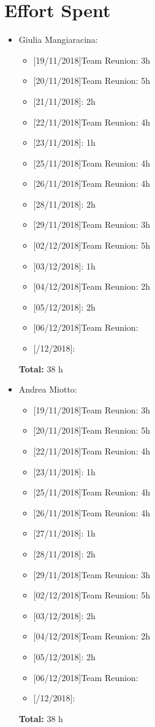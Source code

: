 \chapter{Effort Spent}

\begin{itemize}
\item Giulia Mangiaracina: 
\begin{itemize}
    \item {[}19/11/2018{]}Team Reunion: 3h
    \item {[}20/11/2018{]}Team Reunion: 5h
    \item {[}21/11/2018{]}: 2h
    \item {[}22/11/2018{]}Team Reunion: 4h
    \item {[}23/11/2018{]}: 1h
    \item {[}25/11/2018{]}Team Reunion: 4h
    \item {[}26/11/2018{]}Team Reunion: 4h
    \item {[}28/11/2018{]}: 2h
    \item {[}29/11/2018{]}Team Reunion: 3h
    \item {[}02/12/2018{]}Team Reunion: 5h
    \item {[}03/12/2018{]}: 1h
    \item {[}04/12/2018{]}Team Reunion:  2h
    \item {[}05/12/2018{]}: 2h
    \item {[}06/12/2018{]}Team Reunion:
    \item {[}/12/2018{]}: 
\end{itemize}
\textbf{Total:} 38 h

\item Andrea Miotto: 
\begin{itemize}
     \item {[}19/11/2018{]}Team Reunion: 3h
    \item {[}20/11/2018{]}Team Reunion: 5h
    \item {[}22/11/2018{]}Team Reunion: 4h
    \item {[}23/11/2018{]}: 1h
    \item {[}25/11/2018{]}Team Reunion: 4h
    \item {[}26/11/2018{]}Team Reunion: 4h
    \item {[}27/11/2018{]}: 1h
    \item {[}28/11/2018{]}: 2h
    \item {[}29/11/2018{]}Team Reunion: 3h
    \item {[}02/12/2018{]}Team Reunion: 5h
    \item {[}03/12/2018{]}: 2h
    \item {[}04/12/2018{]}Team Reunion:  2h
    \item {[}05/12/2018{]}: 2h
    \item {[}06/12/2018{]}Team Reunion:
    \item {[}/12/2018{]}:
\end{itemize}
\textbf{Total:} 38 h


\end{itemize}

